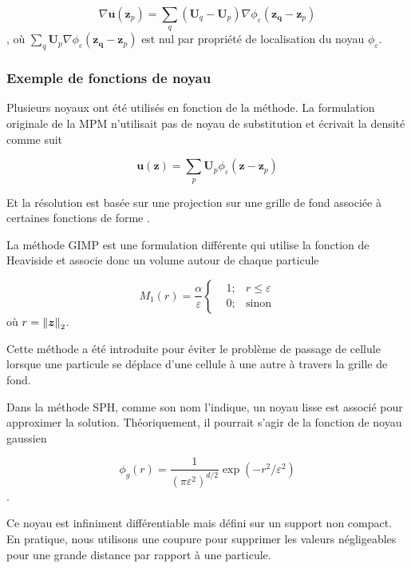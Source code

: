 \begin{equation*}
    \nabla \bm{u}(\bm{z}_p) = \sum_q (\bm{U}_q - \bm{U}_p) \nabla \phi_\varepsilon (\bm{z_q}-\bm{z}_p)
\end{equation*}, où $\sum_q \bm{U}_p \nabla \phi_\varepsilon (\bm{z_q}-\bm{z}_p)$ est nul par propriété de localisation du noyau $\phi_\varepsilon$.

\subsubsection{Exemple de fonctions de noyau}

Plusieurs noyaux ont été utilisés en fonction de la méthode. La formulation originale de la MPM n'utilisait pas de noyau de substitution et écrivait la densité comme suit

\begin{equation*}
    \bm{u}(\bm{z}) = \sum_p \bm{U}_p \phi_\varepsilon (\bm{z}-\bm{z}_p)
\end{equation*}

Et la résolution est basée sur une projection sur une grille de fond associée à certaines fonctions de forme \cite{sulsky_particle_1994}.

La méthode GIMP est une formulation différente qui utilise la fonction de Heaviside \cite{bardenhagen_generalized_2004} et associe donc un volume autour de chaque particule

\begin{equation*}
    M_1(r) = \frac{\alpha}{\varepsilon}\left\{\begin{aligned}
         & 1; & r \leq \varepsilon \\
         & 0; & \text{sinon}
    \end{aligned}
    \right.
\end{equation*}où $r = \left\lVert \bm{z} \right\rVert_2$.

Cette méthode a été introduite pour éviter le problème de passage de cellule lorsque une particule se déplace d'une cellule à une autre à travers la grille de fond.

Dans la méthode SPH, comme son nom l'indique, un noyau lisse est associé pour approximer la solution. Théoriquement, il pourrait s'agir de la fonction de noyau gaussien

\begin{equation*}
    \phi_g(r) = \frac{1}{{(\pi \varepsilon^2)}^{d/2}} \exp(-r^2/\varepsilon^2)
\end{equation*}.

Ce noyau est infiniment différentiable mais défini sur un support non compact. En pratique, nous utilisons une coupure pour supprimer les valeurs négligeables pour une grande distance par rapport à une particule.

